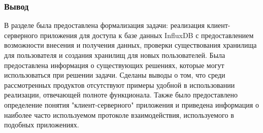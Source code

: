 \subsubsection*{Вывод}
В разделе была предоставлена формализация задачи: реализация клиент-серверного приложения для доступа к базе данных InfluxDB с предоставлением возможности внесения и получения данных, проверки существования хранилища для пользователя и создания хранилищ для новых пользователей.
Была предоставлена информация о существующих решениях, которые могут использоваться при решении задачи. Сделаны выводы о том, что среди рассмотренных продуктов отсутствуют примеры удобной в использовании реализации, отвечающей полноте функционала.
Также было предоставлено определение понятия "клиент-серверного" приложения и приведена информация о наиболее часто используемом протоколе взаимодействия, используемого в подобных приложениях.


\pagebreak